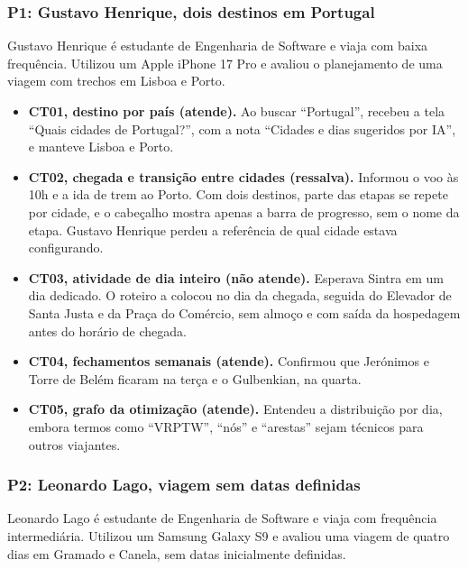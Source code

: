 \subsubsection{P1: Gustavo Henrique, dois destinos em Portugal}

Gustavo Henrique é estudante de Engenharia de Software e viaja com baixa frequência. Utilizou um Apple iPhone 17 Pro e avaliou o planejamento de uma viagem com trechos em Lisboa e Porto.

\begin{itemize}
  \item \textbf{CT01, destino por país (atende).} Ao buscar ``Portugal'', recebeu a tela ``Quais cidades de Portugal?'', com a nota ``Cidades e dias sugeridos por IA'', e manteve Lisboa e Porto.
  \item \textbf{CT02, chegada e transição entre cidades (ressalva).} Informou o voo às 10h e a ida de trem ao Porto. Com dois destinos, parte das etapas se repete por cidade, e o cabeçalho mostra apenas a barra de progresso, sem o nome da etapa. Gustavo Henrique perdeu a referência de qual cidade estava configurando.
  \item \textbf{CT03, atividade de dia inteiro (não atende).} Esperava Sintra em um dia dedicado. O roteiro a colocou no dia da chegada, seguida do Elevador de Santa Justa e da Praça do Comércio, sem almoço e com saída da hospedagem antes do horário de chegada.
  \item \textbf{CT04, fechamentos semanais (atende).} Confirmou que Jerónimos e Torre de Belém ficaram na terça e o Gulbenkian, na quarta.
  \item \textbf{CT05, grafo da otimização (atende).} Entendeu a distribuição por dia, embora termos como ``VRPTW'', ``nós'' e ``arestas'' sejam técnicos para outros viajantes.
\end{itemize}

\subsubsection{P2: Leonardo Lago, viagem sem datas definidas}

Leonardo Lago é estudante de Engenharia de Software e viaja com frequência intermediária. Utilizou um Samsung Galaxy S9 e avaliou uma viagem de quatro dias em Gramado e Canela, sem datas inicialmente definidas.

